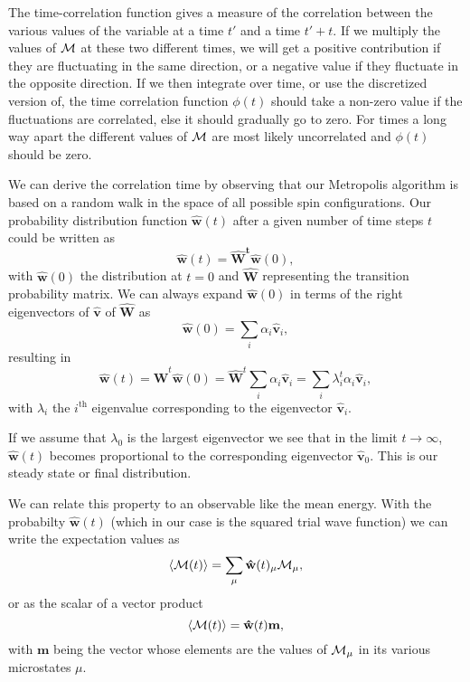 \documentclass[graybox,sectrefs,envcountresetchap,open=right]{svmonodo}
\begin{document}
The time-correlation function gives a measure of the correlation between the various values of the variable 
at a time $t'$ and a time $t'+t$. If we multiply the values of ${\cal M}$ at these two different times,
we will get a positive contribution if they are fluctuating in the same direction, or a negative value
if they fluctuate in the opposite direction. If we then integrate over time, or use the discretized version of, the time correlation function $\phi(t)$ should take a non-zero value if the fluctuations are 
correlated, else it should gradually go to zero. For times a long way apart 
the different values of ${\cal M}$  are most likely 
uncorrelated and $\phi(t)$ should be zero.






We can derive the correlation time by observing that our Metropolis algorithm is based on a random
walk in the space of all  possible spin configurations. 
Our probability 
distribution function $\mathbf{\hat{w}}(t)$ after a given number of time steps $t$ could be written as
\[
   \mathbf{\hat{w}}(t) = \mathbf{\hat{W}^t\hat{w}}(0),
\]
with $\mathbf{\hat{w}}(0)$ the distribution at $t=0$ and $\mathbf{\hat{W}}$ representing the 
transition probability matrix. 
We can always expand $\mathbf{\hat{w}}(0)$ in terms of the right eigenvectors of 
$\mathbf{\hat{v}}$ of $\mathbf{\hat{W}}$ as 
\[
    \mathbf{\hat{w}}(0)  = \sum_i\alpha_i\mathbf{\hat{v}}_i,
\]
resulting in 
\[
   \mathbf{\hat{w}}(t) = \mathbf{\hat{W}}^t\mathbf{\hat{w}}(0)=\mathbf{\hat{W}}^t\sum_i\alpha_i\mathbf{\hat{v}}_i=
\sum_i\lambda_i^t\alpha_i\mathbf{\hat{v}}_i,
\]
with $\lambda_i$ the $i^{\mathrm{th}}$ eigenvalue corresponding to  
the eigenvector $\mathbf{\hat{v}}_i$. 





If we assume that $\lambda_0$ is the largest eigenvector we see that in the limit $t\rightarrow \infty$,
$\mathbf{\hat{w}}(t)$ becomes proportional to the corresponding eigenvector 
$\mathbf{\hat{v}}_0$. This is our steady state or final distribution. 

We can relate this property to an observable like the mean energy.
With the probabilty $\mathbf{\hat{w}}(t)$ (which in our case is the squared trial wave function) we
can write the expectation values as 
\[
 \langle {\cal M}(t) \rangle  = \sum_{\mu} \mathbf{\hat{w}}(t)_{\mu}{\cal M}_{\mu},
\] 
or as the scalar of a  vector product
 \[
 \langle {\cal M}(t) \rangle  = \mathbf{\hat{w}}(t)\mathbf{m},
\] 
with $\mathbf{m}$ being the vector whose elements are the values of ${\cal M}_{\mu}$ in its 
various microstates $\mu$.
\end{document}
